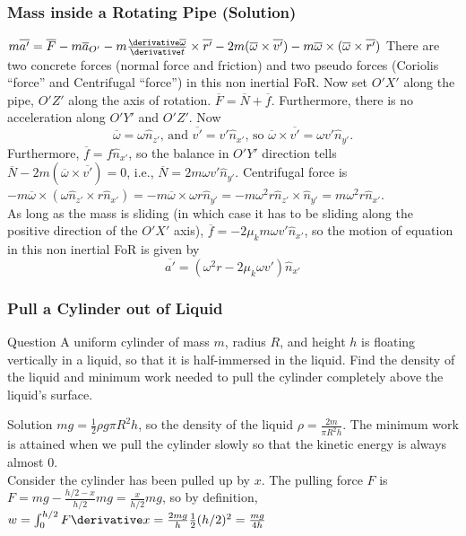 \begin{frame}
\frametitle{Mass inside a Rotating Pipe (Solution)}
$m\overline{a'}=\overline{F}-m\overline{a}_{O'}-m\frac{\derivative\overline{\omega}}{\derivative t}\times \overline{r'}-2m(\overline{\omega}\times\overline{v'})-m\overline{\omega}\times(\overline{\omega}\times\overline{r'})$
There are two concrete forces (\alert{normal} force and \alert{friction}) and two pseudo forces (\alert{Coriolis} ``force'' and \alert{Centrifugal} ``force'') in this non inertial FoR. Now set $O'X'$ \alert{along} the pipe, $O'Z'$ \alert{along} the axis of rotation. $\overline{F}=\overline{N}+\overline{f}$. Furthermore, there is no acceleration along $O'Y'$ and $O'Z'$. Now \[\overline{\omega}=\omega\hat{n}_{z'}\text{, and }\overline{v'}=v'\hat{n}_{x'}\text{, so }\overline{\omega}\times\overline{v'}=\omega v'\hat{n}_{y'}.\] Furthermore, $\overline{f}=f\hat{n}_{x'}$, so the \alert{balance} in $O'Y'$ direction tells $\overline{N}-2m(\overline{\omega}\times\overline{v'})=0$, i.e., $\overline{N}=2m\omega v'\hat{n}_{y'}$. \alert{Centrifugal} force is $-m\overline{\omega}\times(\omega\hat{n}_{z'}\times r\hat{n}_{x'})=-m\overline{\omega}\times\omega r\hat{n}_{y'}=-m\omega^2 r\hat{n}_{z'}\times\hat{n}_{y'}=m\omega^2 r\hat{n}_{x'}$.\\As long as the mass is \alert{sliding} (in which case it has to be sliding along the positive direction of the $O'X'$ axis), $\overline{f}=-2\mu_k m\omega v'\hat{n}_{x'}$, so the motion of equation in this non inertial FoR is given by
\[\overline{a'}=(\omega^2 r-2\mu_k \omega v')\hat{n}_{x'}\]
\end{frame}
\begin{frame}
\frametitle{Pull a Cylinder out of Liquid}
\begin{block}{Question}
A uniform cylinder of mass $m$, radius $R$, and height $h$ is floating vertically in a liquid, so that it is
half-immersed in the liquid. Find the density of the liquid and minimum work needed to pull the
cylinder completely above the liquid’s surface.
\end{block}
\begin{block}{Solution}
$mg=\frac{1}{2}\rho g\pi R^2 h$, so the \alert{density} of the liquid $\rho=\frac{2m}{\pi R^2 h}$. The minimum work is attained when we pull the cylinder slowly so that the kinetic energy is always almost 0.\\
Consider the cylinder has been pulled up \alert{by} $x$. The pulling force $F$ is $F=mg-\frac{h/2-x}{h/2}mg=\frac{x}{h/2}mg$, so by definition, $w=\int_0^{h/2}F\derivative x=\frac{2mg}{h}\frac{1}{2}(h/2)^2=\frac{mg}{4h}$
\end{block}
\end{frame}
